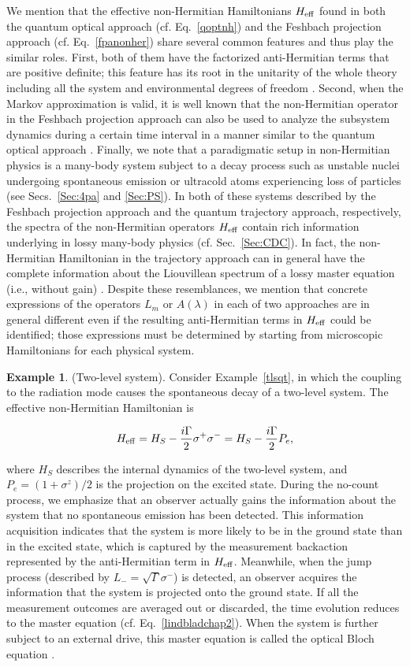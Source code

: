 \documentclass{tADP2e}
\theoremstyle{plain}
\newcommand{\eqn}[1]{
\begin{eqnarray}
	#1
\end{eqnarray}
}
\theoremstyle{plain}
\theoremstyle{definition}
\newtheorem{example}{Example}[section]
\newcommand{\exmp}[1]{
\begin{example}
	#1
\end{example}
}
\begin{document}
We mention that the effective non-Hermitian Hamiltonians $H_{\rm eff}$ found in both the quantum optical approach (cf. Eq.~\eqref{qoptnh}) and the Feshbach projection approach (cf. Eq.~\eqref{fpanonher}) share several common features  and thus play the similar roles. First, both of them have the factorized anti-Hermitian terms that are positive definite; this feature has its root in the unitarity of the whole theory including all the system and environmental degrees of freedom \cite{DL76}. Second, when the Markov approximation is valid, it is well known that the non-Hermitian operator in the Feshbach projection approach can also be used to analyze the subsystem dynamics during a certain time interval in a  manner similar to the quantum optical approach \cite{JGM04,ZR60}. Finally, we note that a paradigmatic setup in non-Hermitian physics is a many-body system subject to a decay process such as   unstable nuclei undergoing spontaneous emission or ultracold atoms experiencing loss of particles (see Secs.~\ref{Sec:4pa} and \ref{Sec:PS}). In both of these systems described by the Feshbach projection approach and the quantum trajectory approach, respectively, the spectra of the non-Hermitian operators  $H_{\rm eff}$ contain rich information underlying in lossy many-body physics (cf. Sec.~\ref{Sec:CDC}). In fact, the non-Hermitian Hamiltonian in the trajectory approach can in general have the complete information about the Liouvillean spectrum of a lossy master equation (i.e., without gain) \cite{BHJ93,TJM14}.
Despite these resemblances, we mention that concrete expressions of the operators $L_m$ or $A(\lambda)$ in each of two approaches are in general different even if the resulting anti-Hermitian terms in $H_{\rm eff}$ could be identified; those expressions must be determined by starting from microscopic Hamiltonians for each physical system.

\exmp{(Two-level system). 
Consider Example~\ref{tlsqt}, in which the coupling to the radiation mode causes  the spontaneous decay of a two-level system.  The effective non-Hermitian Hamiltonian is
\eqn{H_{\rm eff}=H_S-\frac{i\Gamma}{2}\sigma^+\sigma^-=H_S-\frac{i\Gamma}{2}P_{e},
}
where $H_S$ describes the internal dynamics of the two-level system, and $P_e=(1+\sigma^z)/2$ is the projection on the excited state. During the no-count process, we emphasize that an observer actually gains the information about the system that no spontaneous emission has been detected. This information acquisition indicates that the system is more likely to be in the ground state than in the excited state, which is captured by the measurement backaction represented by the anti-Hermitian term in $H_{\rm eff}$.  Meanwhile, when the jump process (described by $L_-=\sqrt{\Gamma}\sigma^-$) is detected, an observer acquires the information that the system is projected onto the ground state. If all the measurement outcomes are averaged out or discarded, the time evolution reduces to the master equation (cf. Eq.~\eqref{lindbladchap2}). When the system is further subject to an external drive, this master equation is called the optical Bloch equation \cite{CCT98}.
}
\end{document}

